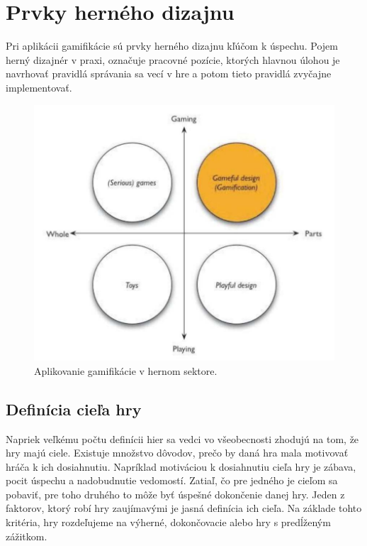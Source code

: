 \documentclass[10pt,twoside,slovak,a4paper]{article}
\begin{document}
\section{Prvky herného dizajnu}
Pri aplikácii gamifikácie sú prvky herného dizajnu kľúčom k úspechu\cite{wee2019gamification}. Pojem herný dizajnér v praxi, označuje pracovné pozície, ktorých hlavnou úlohou je navrhovať pravidlá správania sa vecí v hre a potom tieto pravidlá zvyčajne implementovať\cite{zubek2020elements}.

\begin{figure}[htpb]
    \centering
    \includegraphics[scale=0.5]{Aplikovaniegamifikacie.pdf}
    \caption{Aplikovanie gamifikácie v hernom sektore\cite{deterding2011game}.}
    \label{f:gamifikacia}
\end{figure}

\subsection{Definícia cieľa hry}
Napriek veľkému počtu definícii hier sa vedci vo všeobecnosti zhodujú na tom,  že hry majú ciele\cite{zagal2019ultimate}.   Existuje množstvo dôvodov, prečo by daná hra mala motivovať hráča k ich dosiahnutiu. Napríklad motiváciou k dosiahnutiu cieľa hry je zábava, pocit úspechu a nadobudnutie vedomostí. Zatiaľ, čo pre jedného je cieľom sa pobaviť, pre toho druhého to môže byť úspešné dokončenie danej hry. Jeden z faktorov, ktorý robí hry zaujímavými je jasná definícia ich cieľa.  Na základe tohto kritéria, hry rozdeľujeme na výherné, dokončovacie alebo hry s predĺženým zážitkom.
\end{document}
